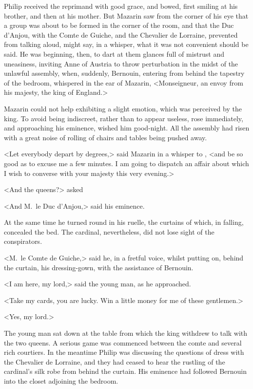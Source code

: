 Philip received the reprimand with good grace, and bowed, first smiling at his brother, and then at his mother. But Mazarin saw from the corner of his eye that a group was about to be formed in the corner of the room, and that the Duc d'Anjou, with the Comte de Guiche, and the Chevalier de Lorraine, prevented from talking aloud, might say, in a whisper, what it was not convenient should be said. He was beginning, then, to dart at them glances full of mistrust and uneasiness, inviting Anne of Austria to throw perturbation in the midst of the unlawful assembly, when, suddenly, Bernouin, entering from behind the tapestry of the bedroom, whispered in the ear of Mazarin, <Monseigneur, an envoy from his majesty, the king of England.>

Mazarin could not help exhibiting a slight emotion, which was perceived by the king. To avoid being indiscreet, rather than to appear useless,  rose immediately, and approaching his eminence, wished him good-night. All the assembly had risen with a great noise of rolling of chairs and tables being pushed away.

<Let everybody depart by degrees,> said Mazarin in a whisper to , <and be so good as to excuse me a few minutes. I am going to dispatch an affair about which I wish to converse with your majesty this very evening.>

<And the queens?> asked 

<And M.~le Duc d'Anjou,> said his eminence.

At the same time he turned round in his ruelle, the curtains of which, in falling, concealed the bed. The cardinal, nevertheless, did not lose sight of the conspirators.

<M.~le Comte de Guiche,> said he, in a fretful voice, whilst putting on, behind the curtain, his dressing-gown, with the assistance of Bernouin.

<I am here, my lord,> said the young man, as he approached.

<Take my cards, you are lucky. Win a little money for me of these gentlemen.>

<Yes, my lord.>

The young man sat down at the table from which the king withdrew to talk with the two queens. A serious game was commenced between the comte and several rich courtiers. In the meantime Philip was discussing the questions of dress with the Chevalier de Lorraine, and they had ceased to hear the rustling of the cardinal's silk robe from behind the curtain. His eminence had followed Bernouin into the closet adjoining the bedroom. 